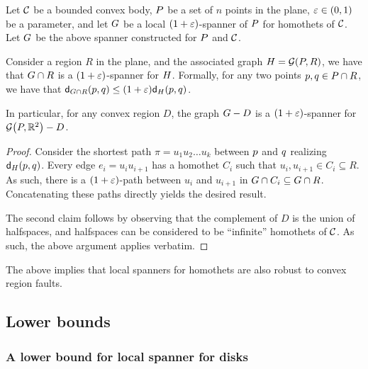 \documentclass[12pt]{article}%
\begin{document}
\begin{corollary}
    Let $\mathcal{C}$ be a bounded convex body, $P$ be a set of $n$ points
    in the plane, $\varepsilon \in (0,1)$ be a parameter, and let $G$ be a
    local $(1+\varepsilon)$-spanner of $P$ for homothets of $\mathcal{C}$. Let $G$
    be the above spanner constructed for $P$ and $\mathcal{C}$.

    Consider a region $R$ in the plane, and the associated graph
    $\GA = \GY{\PS}{R}$, we have that $G \cap {R}$ is a
    $(1+\varepsilon)$-spanner for $H$. Formally, for any two points
    $p, q \in P \cap R$, we have that
    $\dGZ{\restrictY{\G}{R}}{\pa}{\pb}\leq (1+\eps)\dGZ{\GA}{\pa}{\pb}
    $.

    In particular, for any convex region $D$, the graph $G - D$
    is a $(1+\varepsilon)$-spanner for $\GY{\PS}{\Re^2} \gminus D$.
\end{corollary}
\begin{proof}
    Consider the shortest path $\pi = u_1 u_2 \ldots u_k$ between
    $p$ and $q$ realizing $\dGZ{\GA}{\pa}{\pb}$. Every edge
    $e_i = u_i u_{i+1}$ has a homothet $C_i$ such that
    $u_i, u_{i+1} \in C_i \subseteq R$. As such, there is a
    $(1+\varepsilon)$-path between $u_i$ and $u_{i+1}$ in
    $G \cap {C_i} \subseteq G \cap {R}$. Concatenating
    these paths directly yields the desired result.

    The second claim follows by observing that the complement of $D$
    is the union of halfspaces, and halfspaces can be considered to be
    ``infinite'' homothets of $\mathcal{C}$. As such, the above argument
    applies verbatim.
\end{proof}

\begin{remark}
    The above implies that local spanners for homothets are also
    robust to convex region faults.
\end{remark}



\subsection{Lower bounds}


\subsubsection{A lower bound for local spanner for disks}
\end{document}
